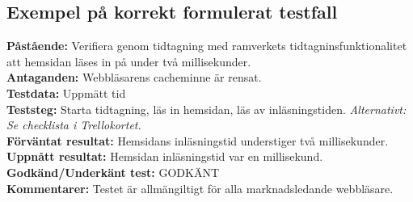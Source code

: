 \subsection{Exempel på korrekt formulerat testfall}
\textbf{Påstående:} Verifiera genom tidtagning med ramverkets tidtagninsfunktionalitet att hemsidan läses in på under två millisekunder. \\
\textbf{Antaganden:} Webbläsarens cacheminne är rensat. \\
\textbf{Testdata:} Uppmätt tid \\
\textbf{Teststeg:} Starta tidtagning, läs in hemsidan, läs av inläsningstiden. \textit{Alternativt: Se checklista i Trellokortet.} \\
\textbf{Förväntat resultat: } Hemsidans inläsningstid understiger två millisekunder. \\
\textbf{Uppnått resultat:} Hemsidan inläsningstid var en millisekund.\\
\textbf{Godkänd/Underkänt test: } GODKÄNT \\
\textbf{Kommentarer:} Testet är allmängiltigt för alla marknadsledande webbläsare. 
